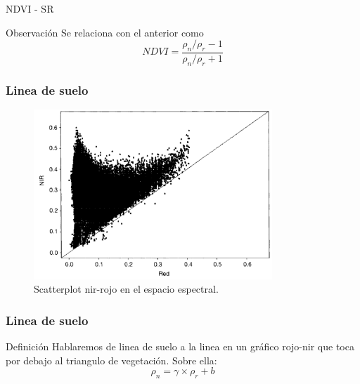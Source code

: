 \documentclass[handout]{beamer}
\begin{document}
\begin{frame}{NDVI - SR}
  \begin{block}{Observación}
    Se relaciona con el anterior como $$NDVI = \frac{\rho_n/\rho_r-1}{\rho_n/\rho_r+1}$$
  \end{block}
\end{frame}

\begin{frame}
    \frametitle{Linea de suelo}
    \begin{figure}
    \begin{center}
        \includegraphics[width=0.8\textwidth]{imagenes/scatter82.png}
    \end{center}
        \caption{Scatterplot nir-rojo en el espacio espectral. }
    \end{figure}
\end{frame}


\begin{frame}
    \frametitle{Linea de suelo}
     \begin{block}{Definición}
        Hablaremos de linea de suelo a la linea en un gráfico rojo-nir que toca
        por debajo al triangulo de vegetación. Sobre ella:
         \begin{equation}
             \rho_n = \gamma \times \rho_r +b
         \end{equation}
     \end{block}
\end{frame}
\end{document}

